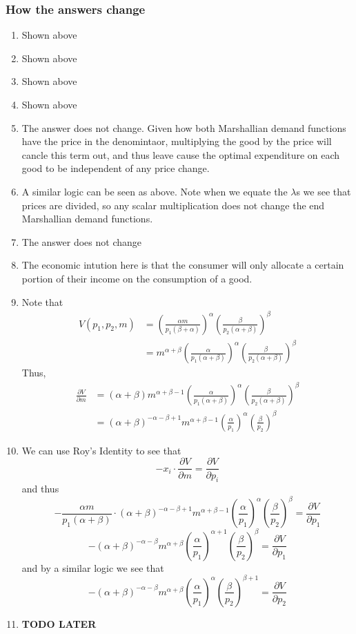 \documentclass[12pt]{article}
\begin{document}
\subsubsection*{How the answers change}
\begin{enumerate}[label=\alph*]
    \item Shown above 
    \item Shown above 
    \item Shown above
    \item Shown above
    \item The answer does not change. Given how both Marshallian demand functions have the price in the denomintaor, multiplying the good by the price will cancle this term out, and thus leave cause the optimal expenditure on each good to be independent of any price change. 
    \item A similar logic can be seen as above. Note when we equate the $\lambda$s we see that prices are divided, so any scalar multiplication does not change the end Marshallian demand functions. 
    \item The answer does not change
    \item The economic intution here is that the consumer will only allocate a certain portion of their income on the consumption of a good. 
    \item Note that 
    \begin{align*}
        V(p_1, p_2, m) &= \left( \frac{\alpha m}{p_1(\beta + \alpha)} \right)^{\alpha} \left( \frac{\beta}{p_2(\alpha + \beta)} \right)^\beta \\
        &= m^{\alpha + \beta} \left( \frac{\alpha}{p_1(\alpha + \beta)} \right)^\alpha \left( \frac{\beta}{p_2(\alpha + \beta)} \right)^\beta
    \end{align*}
    Thus, 
    \begin{align*}
        \frac{\partial V}{\partial m} &= (\alpha + \beta) m^{\alpha + \beta -1} \left( \frac{\alpha}{p_1(\alpha + \beta)} \right)^\alpha \left( \frac{\beta}{p_2(\alpha + \beta)} \right)^\beta\\
        &= (\alpha + \beta)^{-\alpha - \beta + 1} m^{\alpha + \beta -1} \left( \frac{\alpha}{p_1} \right)^\alpha \left( \frac{\beta}{p_2} \right)^\beta
    \end{align*}
    \item We can use Roy's Identity to see that 
    \[
        - x_i \cdot \frac{\partial V}{\partial m} = \frac{\partial V}{\partial p_i}
    \]
    and thus
    \[
    -\frac{\alpha m}{p_1(\alpha + \beta)} \cdot (\alpha + \beta)^{-\alpha - \beta + 1} m^{\alpha + \beta -1} \left( \frac{\alpha}{p_1} \right)^\alpha \left( \frac{\beta}{p_2} \right)^\beta = \frac{\partial V}{\partial p_1}
    \]
    \[
    -(\alpha + \beta)^{-\alpha - \beta} m^{\alpha + \beta} \left( \frac{\alpha}{p_1} \right)^{\alpha + 1} \left( \frac{\beta}{p_2} \right)^\beta = \frac{\partial V}{\partial p_1}
    \]
    and by a similar logic we see that
    \[
        -(\alpha + \beta)^{-\alpha - \beta} m^{\alpha + \beta} \left( \frac{\alpha}{p_1} \right)^{\alpha} \left( \frac{\beta}{p_2} \right)^{\beta + 1} = \frac{\partial V}{\partial p_2}
    \]
    \item \textbf{TODO LATER}
\end{enumerate}
\end{document}

